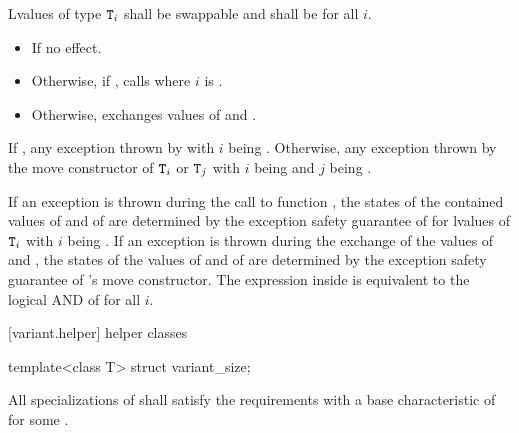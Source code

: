\begin{itemdescr}
\pnum
\requires Lvalues of type $\texttt{T}_i$ shall be swappable and
 shall be  for all $i$.

\pnum
\effects
\begin{itemize}
\item
If  no effect.
\item
Otherwise, if , calls  where $i$ is .
\item
Otherwise, exchanges values of  and .
\end{itemize}

\pnum
\throws
If ,
any exception thrown by 
with $i$ being .
Otherwise, any exception thrown by the move constructor
of $\texttt{T}_i$ or $\texttt{T}_j$
with $i$ being  and $j$ being .

\pnum
\remarks
If an exception is thrown during the call to function ,
the states of the contained values of  and of  are
determined by the exception safety guarantee of  for lvalues of
$\texttt{T}_i$ with $i$ being .
If an exception is thrown during the exchange of the values of 
and , the states of the values of  and of 
are determined by the exception safety guarantee of 's move constructor.
The expression inside  is equivalent to the logical AND of
 for all $i$.
\end{itemdescr}

[variant.helper]{ helper classes}

%
\begin{itemdecl}
template<class T> struct variant_size;
\end{itemdecl}

\begin{itemdescr}
\pnum
\remarks
All specializations of  shall satisfy the
 requirements
with a base characteristic of  for some .
\end{itemdescr}

